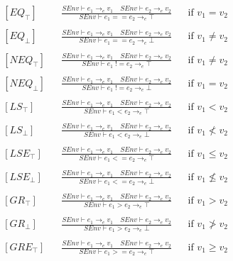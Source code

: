 \begin{align*}
&[EQ_\top] & &\frac{SEnv \vdash e_1 \rightarrow_e v_1 \quad SEnv \vdash e_2 \rightarrow_e v_2}{SEnv \vdash e_1 == e_2 \rightarrow_e \top} & &\text{if } v_1 = v_2\\\\
&[EQ_\bot] & &\frac{SEnv \vdash e_1 \rightarrow_e v_1 \quad SEnv \vdash e_2 \rightarrow_e v_2}{SEnv \vdash e_1 == e_2 \rightarrow_e \bot} & &\text{if } v_1 \ne v_2\\\\
&[NEQ_\top] & &\frac{SEnv \vdash e_1 \rightarrow_e v_1 \quad SEnv \vdash e_2 \rightarrow_e v_2}{SEnv \vdash e_1\; != e_2 \rightarrow_e \top} & &\text{if } v_1 \ne v_2\\\\
&[NEQ_\bot] & &\frac{SEnv \vdash e_1 \rightarrow_e v_1 \quad SEnv \vdash e_2 \rightarrow_e v_2}{SEnv \vdash e_1\; != e_2 \rightarrow_e \bot} & &\text{if } v_1 = v_2\\\\
&[LS_\top] & &\frac{SEnv \vdash e_1 \rightarrow_e v_1 \quad SEnv \vdash e_2 \rightarrow_e v_2}{SEnv \vdash e_1 < e_2 \rightarrow_e \top} & &\text{if } v_1 < v_2\\\\
&[LS_\bot] & &\frac{SEnv \vdash e_1 \rightarrow_e v_1 \quad SEnv \vdash e_2 \rightarrow_e v_2}{SEnv \vdash e_1 < e_2 \rightarrow_e \bot} & &\text{if } v_1 \nless v_2\\\\
&[LSE_\top] & &\frac{SEnv \vdash e_1 \rightarrow_e v_1 \quad SEnv \vdash e_2 \rightarrow_e v_2}{SEnv \vdash e_1 <= e_2 \rightarrow_e \top} & &\text{if } v_1 \leq v_2\\\\
&[LSE_\bot] & &\frac{SEnv \vdash e_1 \rightarrow_e v_1 \quad SEnv \vdash e_2 \rightarrow_e v_2}{SEnv \vdash e_1 <= e_2 \rightarrow_e \bot} & &\text{if } v_1 \nleq v_2\\\\
&[GR_\top] & &\frac{SEnv \vdash e_1 \rightarrow_e v_1 \quad SEnv \vdash e_2 \rightarrow_e v_2}{SEnv \vdash e_1 > e_2 \rightarrow_e \top} & &\text{if } v_1 > v_2\\\\
&[GR_\bot] & &\frac{SEnv \vdash e_1 \rightarrow_e v_1 \quad SEnv \vdash e_2 \rightarrow_e v_2}{SEnv \vdash e_1 > e_2 \rightarrow_e \bot} & &\text{if } v_1 \ngtr v_2\\\\
&[GRE_\top] & &\frac{SEnv \vdash e_1 \rightarrow_e v_1 \quad SEnv \vdash e_2 \rightarrow_e v_2}{SEnv \vdash e_1 >= e_2 \rightarrow_e \top} & &\text{if } v_1 \geq v_2\\\\

\end{align*}
